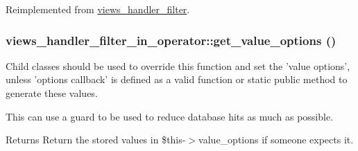 Reimplemented from \hyperlink{classviews__handler__filter_a07ab6afc47bf892fb5fd5934c3f1d64c}{views\_\-handler\_\-filter}.\hypertarget{classviews__handler__filter__in__operator_aa5b5df6d90f4359ed28c0c446bdc81a6}{
\subsubsection[{get\_\-value\_\-options}]{\setlength{\rightskip}{0pt plus 5cm}views\_\-handler\_\-filter\_\-in\_\-operator::get\_\-value\_\-options ()}}
\label{classviews__handler__filter__in__operator_aa5b5df6d90f4359ed28c0c446bdc81a6}
Child classes should be used to override this function and set the 'value options', unless 'options callback' is defined as a valid function or static public method to generate these values.

This can use a guard to be used to reduce database hits as much as possible.

\begin{DoxyReturn}{Returns}
Return the stored values in \$this-\/$>$value\_\-options if someone expects it. 
\end{DoxyReturn}


